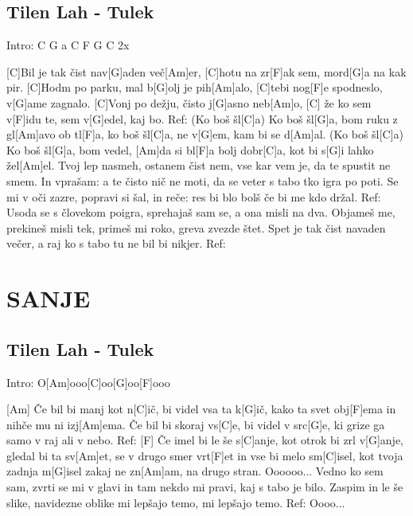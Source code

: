 \documentclass{article}
\begin{document}
\subsection*{Tilen Lah - Tulek}
\begin{guitar}
Intro: C G a C F G C 2x

[C]Bil je tak čist nav[G]aden več[Am]er,
[C]hotu na zr[F]ak sem, mord[G]a na kak pir.
[C]Hodm po parku, mal b[G]olj je pih[Am]alo,
[C]tebi nog[F]e spodneslo, v[G]ame zagnalo.
[C]Vonj po dežju, čisto j[G]asno neb[Am]o,
[C] že ko sem v[F]idu te, sem v[G]edel, kaj bo.
\linebreak
Ref:
(Ko boš šl[C]a) Ko boš šl[G]a, bom ruku z gl[Am]avo ob tl[F]a,
ko boš šl[C]a, ne v[G]em, kam bi se d[Am]al.
(Ko boš šl[C]a) Ko boš šl[G]a, bom vedel, [Am]da si bl[F]a bolj dobr[C]a,
kot bi s[G]i lahko žel[Am]el.
\linebreak
Tvoj lep nasmeh, ostanem čist nem,
vse kar vem je, da te spustit ne smem.
In vprašam: a te čisto nič ne moti, da se
veter s tabo tko igra po poti.
Se mi v oči zazre, popravi si šal, in reče:
res bi blo bolš če bi me kdo držal.
\linebreak
Ref:
\linebreak
Usoda se s človekom poigra,
sprehajaš sam se, a ona misli na dva.
Objameš me, prekineš misli tek,
primeš mi roko, greva zvezde štet.
Spet je tak čist navaden večer,
a raj ko s tabo tu ne bil bi nikjer.
\linebreak
Ref:
\end{guitar}
\pagebreak

\section*{SANJE}
%
\subsection*{Tilen Lah - Tulek}
\begin{guitar}
Intro: O[Am]ooo[C]oo[G]oo[F]ooo

[Am] Če bil bi manj kot n[C]ič, bi videl vsa ta k[G]ič,
kako ta svet obj[F]ema in nihče mu ni izj[Am]ema.
Če bil bi skoraj vs[C]e, bi videl v src[G]e,
ki grize ga samo v raj ali v nebo.
\linebreak
Ref:
[F] Če imel bi le še s[C]anje,
kot otrok bi zrl v[G]anje,
gledal bi ta sv[Am]et, se v drugo smer vrt[F]et
in vse bi melo sm[C]isel, kot tvoja zadnja m[G]isel
zakaj ne zn[Am]am, na drugo stran.
Oooooo...
\linebreak
Vedno ko sem sam, zvrti se mi v glavi
in tam nekdo mi pravi, kaj s tabo je bilo.
Zaspim in le še slike, navidezne oblike
mi lepšajo temo, mi lepšajo temo.
\linebreak
Ref:
Oooo...
\end{guitar}
\pagebreak
\end{document}
